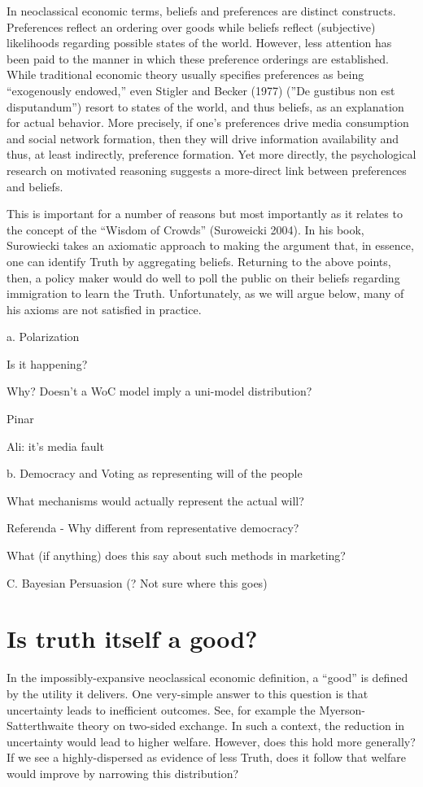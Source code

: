 \documentclass{article}
\begin{document}
\begin{spacing}{2}
In neoclassical economic terms, beliefs and preferences are distinct constructs.  Preferences reflect an ordering over goods while beliefs reflect (subjective) likelihoods regarding possible states of the world. However, less attention has been paid to the manner in which these preference orderings are established. While traditional economic theory usually specifies preferences as being ``exogenously endowed,'' even Stigler and Becker (1977) (''De gustibus non est disputandum'') resort to states of the world, and thus beliefs, as an explanation for actual behavior. More precisely, if one's preferences drive media consumption and social network formation, then they will drive information availability and thus, at least indirectly, preference formation. Yet more directly, the psychological research on motivated reasoning suggests a more-direct link between preferences and beliefs.

This is important for a number of reasons but most importantly as it relates to the concept of the ``Wisdom of Crowds'' (Suroweicki 2004). In his book, Surowiecki takes an axiomatic approach to making the argument that, in essence, one can identify Truth by aggregating beliefs. Returning to the above points, then, a policy maker would do well to poll the public on their beliefs regarding immigration to learn the Truth. Unfortunately, as we will argue below, many of his axioms are not satisfied in practice.

a. Polarization
\item Is it happening?
\item Why?
Doesn't a WoC model imply a uni-model distribution?
\item Pinar
\item Ali: it's media fault

b. Democracy and Voting as representing will of the people
\item What mechanisms would actually represent the actual will?
\item Referenda - Why different from representative democracy?
\item What (if anything) does this say about such methods in marketing?

C. Bayesian Persuasion (? Not sure where this goes)

\section{Is truth itself a good?}\label{Sec: truth_good}
In the impossibly-expansive neoclassical economic definition, a ``good'' is defined by the utility it delivers. One very-simple answer to this question is that uncertainty leads to inefficient outcomes. See, for example the Myerson-Satterthwaite theory on two-sided exchange. In such a context, the reduction in uncertainty would lead to higher welfare. However, does this hold more generally? If we see a highly-dispersed  as evidence of less Truth, does it follow that welfare would improve by narrowing this distribution?


\end{spacing}
\end{document}

